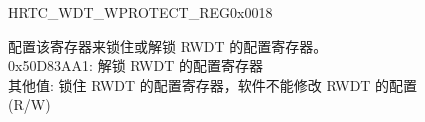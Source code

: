 \begin{register}{H}{RTC\_WDT\_WPROTECT\_REG}{0x0018}\label{regdesc:RTCWDTWPROTECTREG}
%
\regnewline%
\begin{regdesc}\begin{reglist}
\label{fielddesc:RTCWDTWKEY}\item [RTC\_WDT\_WKEY] 配置该寄存器来锁住或解锁 RWDT 的配置寄存器。\\
0x50D83AA1: 解锁 RWDT 的配置寄存器 \\
其他值: 锁住 RWDT 的配置寄存器，软件不能修改 RWDT 的配置 \\
 (R/W)

\end{reglist}\end{regdesc}
\end{register}


